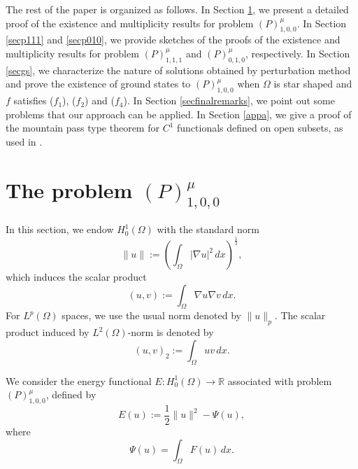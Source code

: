 \documentclass[11pt]{amsart}
\newcommand{\norm}[1]{\lVert#1\rVert}
\numberwithin{equation}{section}
\begin{document}
The rest of the paper is organized as follows. In Section \ref{secp100}, we present a detailed proof of the existence and multiplicity results for problem $(P)^{\mu}_{1,0,0}$. In Section \ref{secp111} and \ref{secp010}, we provide sketches of the proofs of the existence and multiplicity results for problem $(P)^{\mu}_{1,1,1}$ and $(P)^{\mu}_{0,1,0}$, respectively. In Section \ref{secgs}, we characterize the nature of solutions obtained by perturbation method and prove the existence of ground states to $(P)^{\mu}_{1,0,0}$ when $\Omega$ is star shaped and $f$ satisfies ($f_1$), ($f_2$) and ($f_4$). In Section \ref{secfinalremarks}, we point out some problems that our approach can be applied.  In Section \ref{appa}, we give a proof of the  mountain pass type theorem for $C^1$ functionals defined on open subsets, as used in \cite{Bu,Es}.
\section{The problem \texorpdfstring{$(P)^\mu_{1,0,0}$}{Lg}}\label{secp100}
In this section, we endow $H_0^1(\Omega)$ with the standard norm
$$
\|u\|:=\left(\int_{\Omega}|\nabla u|^2\,dx\right)^{\frac{1}{2}},
$$
which induces the scalar product
$$
(u,v):=\int_{\Omega}\nabla u \nabla v\,dx.
$$
For $L^p(\Omega)$ spaces, we use the usual norm denoted by $\norm{u}_p$. The scalar product induced by $L^2(\Omega)$-norm is denoted by
$$
(u,v)_2:=\int_{\Omega} u v\,dx.
$$

We consider the energy functional $E: H^1_0(\Omega) \to \mathbb{R}$ associated with problem  $(P)^\mu_{1,0,0}$, defined by
$$
E(u) := \frac{1}{2}\norm{u}^{2}-\Psi(u),
$$
where
$$
\Psi(u)=\int_\Omega  F(u)\,dx.
$$
\label{sec:preliminaries}
\end{document}
